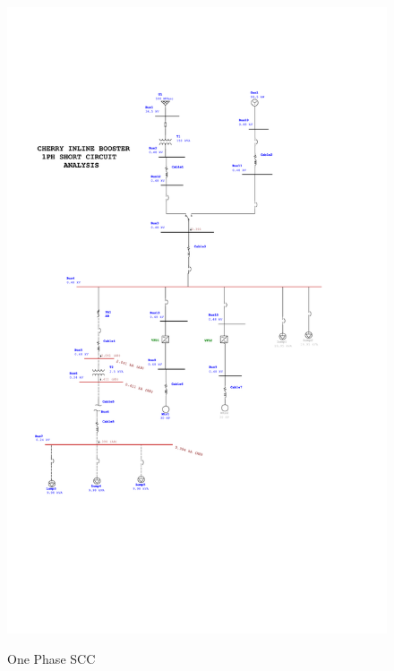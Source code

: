 \begin{figure}[!htb]
%	
	\includegraphics[width=\textwidth]{figures/CHE_1PHSC_with_VFD.pdf} \\
	\caption{One Phase SCC}
	\label{fig_ch04_elecaudit_scc_1phase} 
\end{figure}


